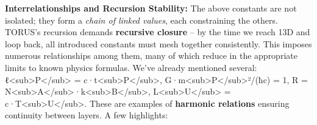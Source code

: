 \textbf{Interrelationships and Recursion Stability:} The above constants
are not isolated; they form a \emph{chain of linked values}, each
constraining the others. TORUS's recursion demands \textbf{recursive
closure} -- by the time we reach 13D and loop back, all introduced
constants must mesh together consistently. This imposes numerous
relationships among them, many of which reduce in the appropriate limits
to known physics formulas. We've already mentioned several:
ℓ\textless{}sub\textgreater{}P\textless{}/sub\textgreater{} =
c·t\textless{}sub\textgreater{}P\textless{}/sub\textgreater{},
G·m\textless{}sub\textgreater{}P\textless{}/sub\textgreater{}²/(ħc) = 1,
R =
N\textless{}sub\textgreater{}A\textless{}/sub\textgreater{}·k\textless{}sub\textgreater{}B\textless{}/sub\textgreater{},
L\textless{}sub\textgreater{}U\textless{}/sub\textgreater{} =
c·T\textless{}sub\textgreater{}U\textless{}/sub\textgreater{}. These are
examples of \textbf{harmonic relations} ensuring continuity between
layers. A few highlights:

